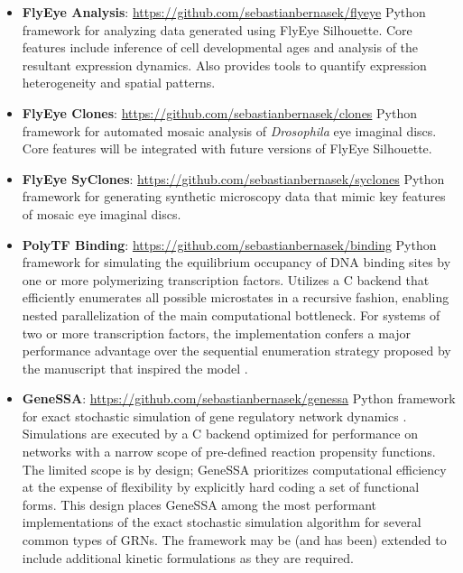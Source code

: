 \begin{itemize}[leftmargin=*, topsep=10pt, parsep=5pt, partopsep=5pt, itemsep=10pt]
    
  \item \textbf{FlyEye Analysis}: \url{https://github.com/sebastianbernasek/flyeye}
  \newline
  Python framework for analyzing data generated using FlyEye Silhouette. Core features include inference of cell developmental ages and analysis of the resultant expression dynamics. Also provides tools to quantify expression heterogeneity and spatial patterns.
  
  \item \textbf{FlyEye Clones}: \url{https://github.com/sebastianbernasek/clones}  
  \newline
  Python framework for automated mosaic analysis of \textit{Drosophila} eye imaginal discs. Core features will be integrated with future versions of FlyEye Silhouette. 
  
  \item \textbf{FlyEye SyClones}: \url{https://github.com/sebastianbernasek/syclones}
  \newline 
  Python framework for generating synthetic microscopy data that mimic key features of mosaic eye imaginal discs.
  
  \item \textbf{PolyTF Binding}: \url{https://github.com/sebastianbernasek/binding}
  \newline 
  Python framework for simulating the equilibrium occupancy of DNA binding sites by one or more polymerizing transcription factors. Utilizes a C backend that efficiently enumerates all possible microstates in a recursive fashion, enabling nested parallelization of the main computational bottleneck. For systems of two or more transcription factors, the implementation confers a major performance advantage over the sequential enumeration strategy proposed by the manuscript that inspired the model \cite{Hope2017}.
  
  \item \textbf{GeneSSA}: \url{https://github.com/sebastianbernasek/genessa}
  \newline
  Python framework for exact stochastic simulation of gene regulatory network dynamics \cite{Gillespie1977}. Simulations are executed by a C backend optimized for performance on networks with a narrow scope of pre-defined reaction propensity functions. The limited scope is by design; GeneSSA prioritizes computational efficiency at the expense of flexibility by explicitly hard coding a set of functional forms. This design places GeneSSA among the most performant implementations of the exact stochastic simulation algorithm for several common types of GRNs. The framework may be (and has been) extended to include additional kinetic formulations as they are required.
  
\end{itemize}

